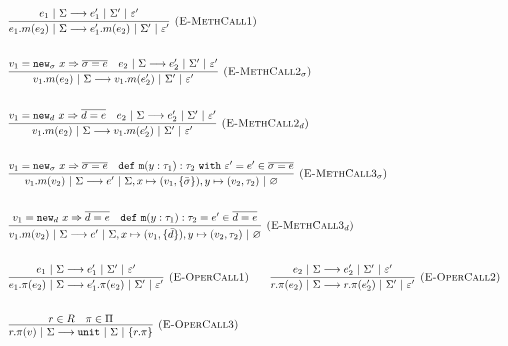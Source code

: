 \documentclass{llncs}
\newcommand{\keywadj}[1]{\mathtt{#1}}
\newcommand{\keyw}[1]{\keywadj{#1}~}
\begin{document}
\[
\begin{array}{lll}
	\infer[\textsc{(E-MethCall1)}]
		{e_1.m(e_2)~|~\Sigma \longrightarrow e_1'.m(e_2)~|~\Sigma'~|~\varepsilon'}
		{e_1~|~\Sigma \longrightarrow e_1'~|~\Sigma'~|~\varepsilon'}\\[5ex]

	\infer[\textsc{(E-MethCall2$_{\sigma}$)}]
		{v_1.m(e_2)~|~\Sigma \longrightarrow v_1.m(e_2')~|~\Sigma'~|~\varepsilon'}
		{v_1 = \keywadj{new}_{\sigma}~x \Rightarrow \overline{\sigma = e} & e_2~|~\Sigma \longrightarrow e_2'~|~\Sigma'~|~\varepsilon'} \\[5ex]
				
	\infer[\textsc{(E-MethCall2$_d$)}]
		{v_1.m(e_2)~|~\Sigma \longrightarrow v_1.m(e_2')~|~\Sigma'~|~\varepsilon'}
		{v_1 = \keywadj{new}_{d}~x \Rightarrow \overline{d = e} & e_2~|~\Sigma \longrightarrow e_2'~|~\Sigma'~|~\varepsilon'}
		\\[5ex]
		
	\infer[\textsc{(E-MethCall3$_{\sigma}$)}]
		{v_1.m(v_2)~|~\Sigma
			\longrightarrow
		 e'~|~\Sigma, x \mapsto (v_1, \{\bar \sigma\}), y \mapsto (v_2, \tau_2)~|~\varnothing}
  		{v_1 = \keywadj{new}_{\sigma}~x \Rightarrow \overline{\sigma = e} & \keywadj{def~m}(y: \tau_1) : \tau_2~\keyw{with} \varepsilon' = e' \in \overline {\sigma = e}} \\[5ex]

	\infer[\textsc{(E-MethCall3$_{d}$)}]
		{v_1.m(v_2)~|~\Sigma
			\longrightarrow
		 e'~|~\Sigma, x \mapsto (v_1, \{ \bar d \}), y \mapsto (v_2, \tau_2)~|~\varnothing}
  		{v_1 = \keywadj{new}_{d}~x \Rightarrow \overline{d = e} & \keywadj{def~m}(y: \tau_1) : \tau_2 = e' \in \overline {d = e}} \\[5ex]
			
	\infer[\textsc{(E-OperCall1)}]
		{e_1.\pi(e_2)~|~\Sigma
			\longrightarrow
		 e_1'.\pi(e_2)~|~\Sigma'~|~\varepsilon'}
		{e_1~|~\Sigma \longrightarrow e_1'~|~\Sigma'~|~\varepsilon'}
~~~~~~
			\infer[\textsc{(E-OperCall2)}]
		{r.\pi(e_2)~|~\Sigma
			\longrightarrow
		 r.\pi(e_2')~|~\Sigma'~|~\varepsilon'}
		{e_2~|~\Sigma \longrightarrow e_2'~|~\Sigma'~|~\varepsilon'} \\[5ex]
			
			\infer[\textsc{(E-OperCall3)}]
		{r.\pi(v)~|~\Sigma
			\longrightarrow
		 \keywadj{unit}~|~\Sigma~|~\{r.\pi\}}
		{r \in R & \pi \in \Pi}
\end{array}
\]

			
\end{document}
